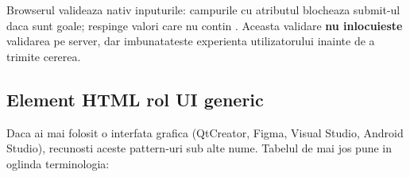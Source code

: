 \begin{ponturi}
Browserul valideaza nativ inputurile: campurile cu atributul  blocheaza submit-ul daca sunt goale;  respinge valori care nu contin . Aceasta validare \textbf{nu inlocuieste} validarea pe server, dar imbunatateste experienta utilizatorului inainte de a trimite cererea.
\end{ponturi}

\subsection{Element HTML \textendash{} rol UI generic}

Daca ai mai folosit o interfata grafica (QtCreator, Figma, Visual Studio, Android Studio), recunosti aceste pattern-uri sub alte nume. Tabelul de mai jos pune in oglinda terminologia:


